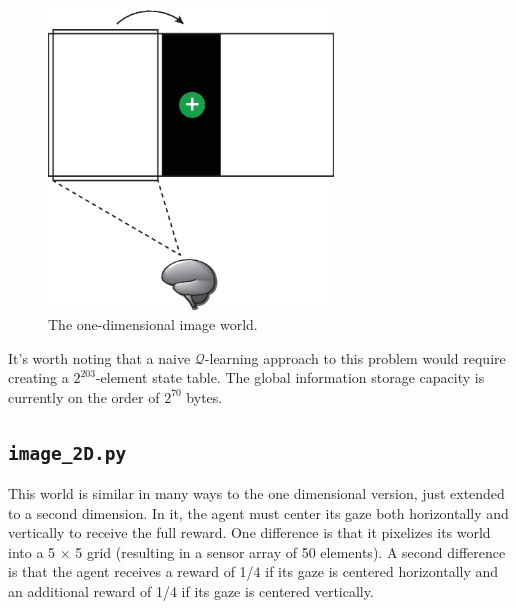 \begin{figure}
\centering
\includegraphics[height=8cm]{figs/image_world_1D.eps}
\caption{The one-dimensional image world.}
\label{image_1D}
\end{figure}

It's worth noting that a naive $\mathcal{Q}$-learning approach to this problem would require creating a $2^203$-element state table. The global information storage capacity is currently on the order of $2^70$ bytes.

\subsection{\texttt{image\_2D.py}}

This world is similar in many ways to the one dimensional version, just extended to a second dimension. In it, the agent must center its gaze both horizontally and vertically to receive the full reward. One difference is that it pixelizes its world into a 5 $\times$ 5 grid (resulting in a sensor array of 50 elements). A second difference is that the agent receives a reward of 1/4 if its gaze is centered horizontally and an additional reward of 1/4 if its gaze is centered vertically. 

